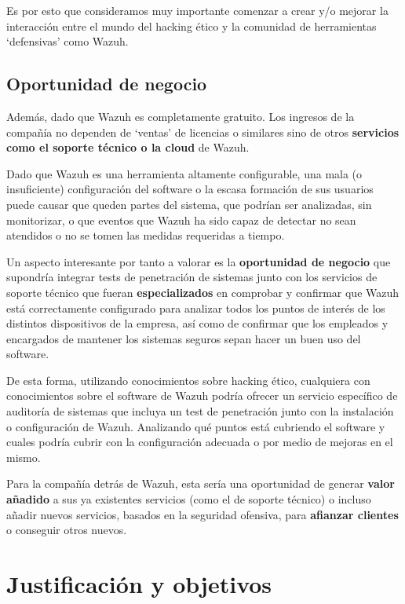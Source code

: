 Es por esto que consideramos muy importante comenzar a crear y/o mejorar la interacción entre el mundo del hacking ético y la comunidad de herramientas `defensivas' como Wazuh. 

\subsection{Oportunidad de negocio}

Además, dado que Wazuh es completamente gratuito. Los ingresos de la compañía no dependen de `ventas' de licencias o similares sino de otros \textbf{servicios como el soporte técnico o la \gls{cloud}} \cite{wcloud} de Wazuh. 

Dado que Wazuh es una herramienta altamente configurable, una mala (o insuficiente) configuración del software o la escasa formación de sus usuarios puede causar que queden partes del sistema, que podrían ser analizadas, sin monitorizar, o que eventos que Wazuh ha sido capaz de detectar no sean atendidos o no se tomen las medidas requeridas a tiempo.

Un aspecto interesante por tanto a valorar es la \textbf{oportunidad de negocio} que supondría integrar tests de penetración de sistemas junto con los servicios de soporte técnico que fueran \textbf{especializados} en comprobar y confirmar que Wazuh está correctamente configurado para analizar todos los puntos de interés de los distintos dispositivos de la empresa, así como de confirmar que los empleados y encargados de mantener los sistemas seguros sepan hacer un buen uso del software.  

De esta forma, utilizando conocimientos sobre hacking ético, cualquiera con conocimientos sobre el software de Wazuh podría ofrecer un servicio específico de auditoría de sistemas que incluya un test de penetración junto con la instalación o configuración de Wazuh. Analizando qué puntos está cubriendo el software y cuales podría cubrir con la configuración adecuada o por medio de mejoras en el mismo.

Para la compañía detrás de Wazuh, esta sería una oportunidad de generar \textbf{valor añadido} a sus ya existentes servicios (como el de soporte técnico) o incluso añadir nuevos servicios, basados en la seguridad ofensiva, para \textbf{afianzar clientes} o conseguir otros nuevos.

\section{Justificación y objetivos}

